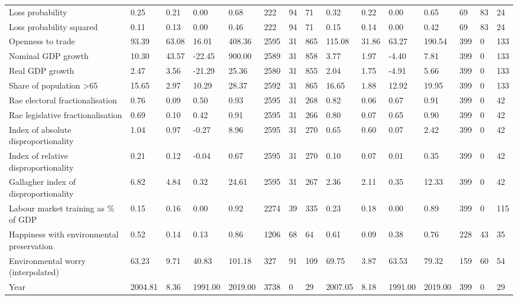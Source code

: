 \begin{longtable}{lllllllllllllll}
Loss probability & 0.25 & 0.21 & 0.00 & 0.68 & 222 & 94 & 71 & 0.32 & 0.22 & 0.00 & 0.65 & 69 & 83 & 24\\
\addlinespace
Loss probability squared & 0.11 & 0.13 & 0.00 & 0.46 & 222 & 94 & 71 & 0.15 & 0.14 & 0.00 & 0.42 & 69 & 83 & 24\\
Openness to trade & 93.39 & 63.08 & 16.01 & 408.36 & 2595 & 31 & 865 & 115.08 & 31.86 & 63.27 & 190.54 & 399 & 0 & 133\\
Nominal GDP growth & 10.30 & 43.57 & -22.45 & 900.00 & 2589 & 31 & 858 & 3.77 & 1.97 & -4.40 & 7.81 & 399 & 0 & 133\\
Real GDP growth & 2.47 & 3.56 & -21.29 & 25.36 & 2580 & 31 & 855 & 2.04 & 1.75 & -4.91 & 5.66 & 399 & 0 & 133\\
Share of population >65 & 15.65 & 2.97 & 10.29 & 28.37 & 2592 & 31 & 865 & 16.65 & 1.88 & 12.92 & 19.95 & 399 & 0 & 133\\
\addlinespace
Rae electoral fractionalisation & 0.76 & 0.09 & 0.50 & 0.93 & 2595 & 31 & 268 & 0.82 & 0.06 & 0.67 & 0.91 & 399 & 0 & 42\\
Rae legislative fractionalisation & 0.69 & 0.10 & 0.42 & 0.91 & 2595 & 31 & 266 & 0.80 & 0.07 & 0.65 & 0.90 & 399 & 0 & 42\\
Index of absolute disproportionality & 1.04 & 0.97 & -0.27 & 8.96 & 2595 & 31 & 270 & 0.65 & 0.60 & 0.07 & 2.42 & 399 & 0 & 42\\
Index of relative disproportionality & 0.21 & 0.12 & -0.04 & 0.67 & 2595 & 31 & 270 & 0.10 & 0.07 & 0.01 & 0.35 & 399 & 0 & 42\\
Gallagher index of disproportionality & 6.82 & 4.84 & 0.32 & 24.61 & 2595 & 31 & 267 & 2.36 & 2.11 & 0.35 & 12.33 & 399 & 0 & 42\\
\addlinespace
Labour market training as \% of GDP & 0.15 & 0.16 & 0.00 & 0.92 & 2274 & 39 & 335 & 0.23 & 0.18 & 0.00 & 0.89 & 399 & 0 & 115\\
Happiness with environmental preservation & 0.52 & 0.14 & 0.13 & 0.86 & 1206 & 68 & 64 & 0.61 & 0.09 & 0.38 & 0.76 & 228 & 43 & 35\\
Environmental worry (interpolated) & 63.23 & 9.71 & 40.83 & 101.18 & 327 & 91 & 109 & 69.75 & 3.87 & 63.53 & 79.32 & 159 & 60 & 54\\
Year & 2004.81 & 8.36 & 1991.00 & 2019.00 & 3738 & 0 & 29 & 2007.05 & 8.18 & 1991.00 & 2019.00 & 399 & 0 & 29\\
\bottomrule
\end{longtable}
